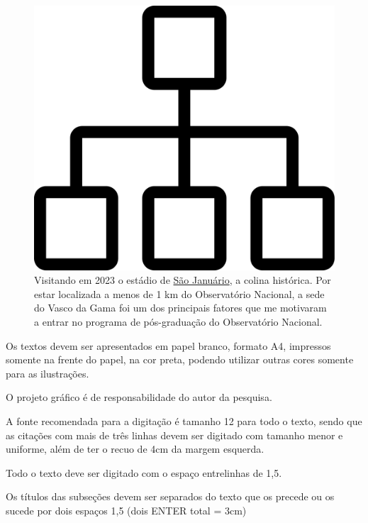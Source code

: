 \documentclass[10pt,a4paper,oneside]{book}
\newcommand{\HeroFigPad}{\vspace{-1cm}}
\begin{document}
\begin{figure}[h]
  \HeroFigPad
  \begin{center}
    \includegraphics[width=\textwidth]{images/inicio.png}
  \end{center}
  \caption{
    Visitando em 2023 o estádio de \href{https://vasco.com.br/sao-januario/}{São Januário}, a colina histórica. Por estar localizada a menos de 1 km do Observatório Nacional, a sede do Vasco da Gama foi um dos principais fatores que me motivaram a entrar no programa de pós-graduação do Observatório Nacional.
  }
  \label{fig_riacho}
\end{figure}

Os textos devem ser apresentados em papel branco, formato A4, impressos somente na frente do papel, na cor preta, podendo utilizar outras cores somente para as ilustrações. 

O projeto gráfico é de responsabilidade do autor da pesquisa.

A fonte recomendada para a digitação é tamanho 12 para todo o texto, sendo que as citações com mais de três linhas devem ser digitado com tamanho menor e uniforme, além de ter o recuo de 4cm da margem esquerda.

Todo o texto deve ser digitado com o espaço entrelinhas de 1,5.

Os títulos das subseções devem ser separados do texto que os precede ou os sucede por dois espaços 1,5 (dois ENTER total = 3cm)
\end{document}
